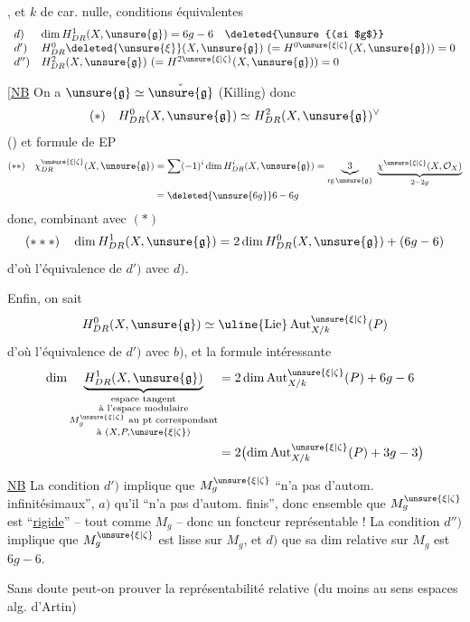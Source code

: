 , et $k$ de car. nulle, conditions équivalentes
\[
\begin{array}{ll}
d)&\dim H^1_{DR}(X,\unsure{\mathfrak g})=6g-6\quad\deleted{\unsure{(si $g$}}\\
d')&H^0_{DR}\deleted{\unsure{\xi}}(X,\unsure{\mathfrak g})\ (=H^{0\unsure{\xi|\zeta}}(X,\unsure{\mathfrak g}))=0\\
d'')&H^2_{DR}(X,\unsure{\mathfrak g})\ (=H^{2\unsure{\xi|\zeta}}(X,\unsure{\mathfrak g}))=0
\end{array}
\]

[\uline{NB} On a $\unsure{\mathfrak g}\simeq\check{\unsure{\mathfrak g}}$ (Killing) donc
\[
(*)\quad H^0_{DR}(X,\unsure{\mathfrak g})\simeq H^2_{DR}(X,\unsure{\mathfrak g})^\vee
\]
() et formule de EP
\[
\begin{aligned}
(**)\quad\chi^{\unsure{\xi|\zeta}}_{DR}(X,\unsure{\mathfrak g})
&=\sum(-1)^i\dim H^i_{DR}(X,\unsure{\mathfrak g})
=\underbrace{3}_{\operatorname{rg}\unsure{\mathfrak g}}\ \underbrace{\chi^{\unsure{\xi|\zeta}}(X,\mathcal O_X)}_{2-2g}\\
&=\deleted{\unsure{6g}}6-6g
\end{aligned}
\]
donc, combinant avec $(*)$
\[
(***)\quad \dim H^1_{DR}(X,\unsure{\mathfrak g})=2\dim H^0_{DR}(X,\unsure{\mathfrak g})+(6g-6)
\]
d'où l'équivalence de $d')$ avec $d)$.

Enfin, on sait
\[
H^0_{DR}(X,\unsure{\mathfrak g})\simeq\uline{\operatorname{Lie}}\operatorname{Aut}^{\unsure{\xi|\zeta}}_{X/k}(P)
\]
d'où l'équivalence de $d')$ avec $b)$, et la formule intéressante
\[
\begin{aligned}
\dim\underbrace{H^1_{DR}(X,\unsure{\mathfrak g})}_{\substack{\text{espace tangent}\\\text{à l'espace modulaire}\\M_g^{\unsure{\xi|\zeta}}\text{ au pt correspondant}\\\text{à }(X,P,\unsure{\xi|\zeta})}}
&=2\dim\operatorname{Aut}^{\unsure{\xi|\zeta}}_{X/k}(P)+6g-6\\
&=2\bigl(\dim\operatorname{Aut}^{\unsure{\xi|\zeta}}_{X/k}(P)+3g-3\bigr)
\end{aligned}
\]

\uline{NB} La condition $d')$ implique que $M_g^{\unsure{\xi|\zeta}}$ ``n'a pas d'autom. infinitésimaux'', $a)$ qu'il ``n'a pas d'autom. finis'', donc ensemble que $M_g^{\unsure{\xi|\zeta}}$ est ``\uline{rigide}'' -- tout comme $M_g$ -- donc un foncteur représentable ! La condition $d'')$ implique que $M_g^{\unsure{\xi|\zeta}}$ est  lisse sur $M_g$, et $d)$ que sa dim relative sur $M_g$ est $6g-6$.

Sans doute peut-on prouver la représentabilité relative (du moins au sens espaces alg. d'Artin)
